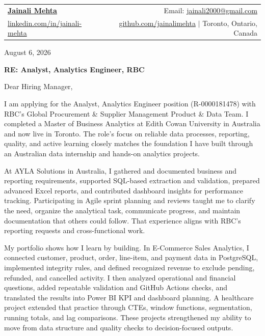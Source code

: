 \documentclass[letterpaper,11pt]{article}
\begin{document}
\begin{tabular*}{\textwidth}{l@{\extracolsep{\fill}}r}
  \textbf{\href{https://www.linkedin.com/in/jainali-mehta}{\Large Jainali Mehta}} & Email: \href{mailto:jainali2000@gmail.com}{jainali2000@gmail.com}\\
  \href{https://www.linkedin.com/in/jainali-mehta}{linkedin.com/in/jainali-mehta} & \href{https://github.com/jainalimehta}{github.com/jainalimehta} $|$ Toronto, Ontario, Canada \\
\end{tabular*}

\hrulefill

\bigbreak
August 6, 2026

\bigbreak
\centerline{\large\textbf{RE: Analyst, Analytics Engineer, RBC}}

\bigbreak
Dear Hiring Manager,

\bigbreak
I am applying for the Analyst, Analytics Engineer position (R-0000181478) with RBC's Global Procurement \& Supplier Management Product \& Data Team. I completed a Master of Business Analytics at Edith Cowan University in Australia and now live in Toronto. The role's focus on reliable data processes, reporting, quality, and active learning closely matches the foundation I have built through an Australian data internship and hands-on analytics projects.

\bigbreak
At AYLA Solutions in Australia, I gathered and documented business and reporting requirements, supported SQL-based extraction and validation, prepared advanced Excel reports, and contributed dashboard insights for performance tracking. Participating in Agile sprint planning and reviews taught me to clarify the need, organize the analytical task, communicate progress, and maintain documentation that others could follow. That experience aligns with RBC's reporting requests and cross-functional work.

\bigbreak
My portfolio shows how I learn by building. In E-Commerce Sales Analytics, I connected customer, product, order, line-item, and payment data in PostgreSQL, implemented integrity rules, and defined recognized revenue to exclude pending, refunded, and cancelled activity. I then analyzed operational and financial questions, added repeatable validation and GitHub Actions checks, and translated the results into Power BI KPI and dashboard planning. A healthcare project extended that practice through CTEs, window functions, segmentation, running totals, and lag comparisons. These projects strengthened my ability to move from data structure and quality checks to decision-focused outputs.
\end{document}
